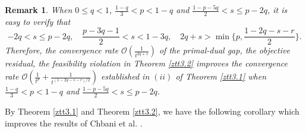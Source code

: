 \documentclass[review]{elsarticle}
\newtheorem{remark}{Remark}[section]
\begin{document}
\begin{remark}\label{remark2}
	When $0\leq q <1$, $\frac{1-q}{3}<p<1-q$ and $\frac{1-p-5q}{2}<s\leq p-2q$, it is easy to verify that
	$$-2q<s\leq p-2q, \quad \frac{p-3q-1}{2}<s<1-3q, \quad 2q+s>\min\{p, \frac{1-2q-s-r}{2}\}.$$
	Therefore, the convergence rate $\mathcal{O}\left(\frac{1}{t^{2q+s}}\right)$ of the primal-dual gap, the objective residual, the feasibility violation in Theorem \ref{ztt3.2} improves the convergence rate $\mathcal{O}\left(\frac{1}{t^{p}}+\frac{1}{t^{(1-2q-s-r)/2}}\right)$ established in $(ii)$ of Theorem \ref{ztt3.1} when $\frac{1-q}{3}<p<1-q$ and $\frac{1-p-5q}{2}<s\leq p-2q$.
\end{remark}
	
	By Theorem \ref{ztt3.1} and  Theorem \ref{ztt3.2}, we have the following corollary which improves the results of  Chbani et al. \cite{ChbaniRBOn(2024)}.
	
\end{document}
